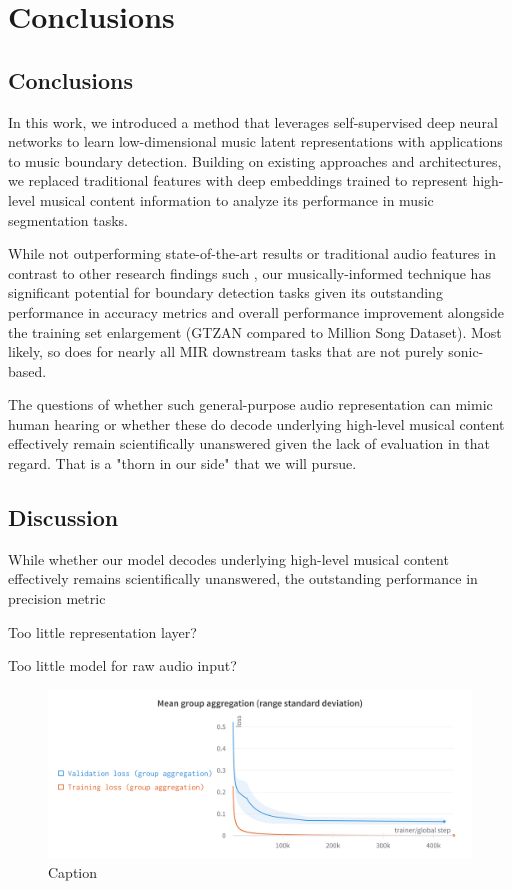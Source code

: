 \chapter{Conclusions}

\section{Conclusions}

In this work, we introduced a method that leverages self-supervised deep neural networks to learn low-dimensional music latent representations with applications to music boundary detection. Building on existing approaches and architectures, we replaced traditional features with deep embeddings trained to represent high-level musical content information to analyze its performance in music segmentation tasks.

While not outperforming state-of-the-art results or traditional audio features in contrast to other research findings such \cite{deepfeaturesegment, SalamonDeepSegmentation}, our musically-informed technique has significant potential for boundary detection tasks given its outstanding performance in accuracy metrics and overall performance improvement alongside the training set enlargement (GTZAN compared to Million Song Dataset). Most likely, so does for nearly all MIR downstream tasks that are not purely sonic-based.

The questions of whether such general-purpose audio representation can mimic human hearing \cite{Li2023MERT:Training, Turian2022HEAR:Representations} or whether these do decode underlying high-level musical content effectively remain scientifically unanswered given the lack of evaluation in that regard. That is a "thorn in our side" that we will pursue.

\section{Discussion}

While whether our model decodes underlying high-level musical content effectively remains scientifically unanswered, the outstanding performance in precision metric

Too little representation layer?

Too little model for raw audio input? \cite{verydeep}

\begin{figure}
    \centering
    \includegraphics[width=\textwidth]{figures/images/Mean group aggregation.png}
    \caption{Caption}
    \label{fig:enter-label}
\end{figure}



\newpage


